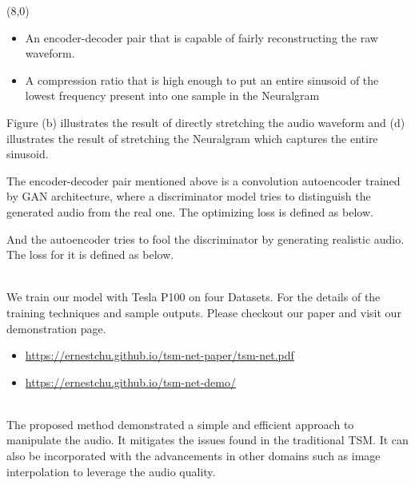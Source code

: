 \documentclass{article}
\begin{document}
\begin{textblock}{7.0}(8,0)
\Large
\begin{itemize}[topsep=-2em]
  \item{An encoder-decoder pair that is capable of fairly reconstructing the raw waveform.}
  \item{A compression ratio that is high enough to put an entire sinusoid of the lowest frequency present into one sample in the Neuralgram}
\end{itemize}
\vspace{1.5em}
Figure (b) illustrates the result of directly stretching the audio waveform and (d) illustrates the result of stretching the Neuralgram which captures the entire sinusoid.
\large 

\Large
The encoder-decoder pair mentioned above is a convolution autoencoder trained by GAN architecture, where a discriminator model tries to distinguish the generated audio from the real one. The optimizing loss is defined as below.

And the autoencoder tries to fool the discriminator by generating realistic audio. The loss for it is defined as below.



\medskip

 \\
\Large
We train our model with Tesla P100 on four Datasets. For the details of the training techniques and sample outputs. Please checkout our paper and visit our demonstration page.
\begin{itemize}[topsep=-1em]
  \item{\url{https://ernestchu.github.io/tsm-net-paper/tsm-net.pdf}}
  \item{\url{https://ernestchu.github.io/tsm-net-demo/}}
\end{itemize}
\vspace{1.5em}

\medskip
{} \\
\Large
The proposed method demonstrated a simple and efficient approach to manipulate the audio. It mitigates the issues found in the traditional TSM. It can also be incorporated with the advancements in other domains such as image interpolation to leverage the audio quality.
\end{textblock}
\end{document}
